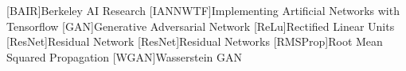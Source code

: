 \documentclass[fleqn,10pt]{SelfArx} %
\begin{document}




\begin{acronym}
[BAIR]{Berkeley AI Research}
[IANNWTF]{Implementing Artificial Networks with Tensorflow}
[GAN]{Generative Adversarial Network}
[ReLu]{Rectified Linear Units}
[ResNet]{Residual Network}
[ResNet]{Residual Networks}
[RMSProp]{Root Mean Squared Propagation}
[WGAN]{Wasserstein \ac{GAN}}
\end{acronym}

\end{document}
